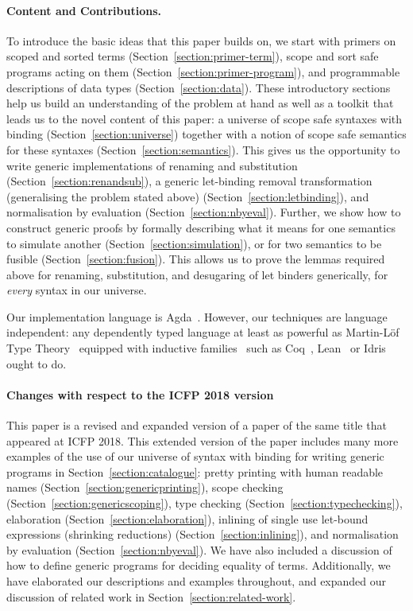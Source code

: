 \paragraph{Content and Contributions.}
To introduce the basic ideas that this paper builds on, we start with
primers on scoped and sorted terms
(Section~\ref{section:primer-term}), scope and sort safe programs
acting on them (Section~\ref{section:primer-program}), and
programmable descriptions of data types (Section~\ref{section:data}).
These introductory sections help us build an understanding of the
problem at hand as well as a toolkit that leads us to the novel
content of this paper: a universe of scope safe syntaxes with binding
(Section~\ref{section:universe}) together with a notion of scope safe
semantics for these syntaxes (Section~\ref{section:semantics}).  This
gives us the opportunity to write generic implementations of renaming
and substitution (Section~\ref{section:renandsub}), a generic
let-binding removal transformation (generalising the problem stated
above) (Section~\ref{section:letbinding}), and normalisation by
evaluation (Section~\ref{section:nbyeval}). Further, we show how to
construct generic proofs by formally describing what it means for one
semantics to simulate another (Section~\ref{section:simulation}), or
for two semantics to be fusible (Section~\ref{section:fusion}). This
allows us to prove the lemmas required above for renaming,
substitution, and desugaring of let binders generically, for
\emph{every} syntax in our universe.

\medskip

Our implementation language is
Agda~\cite{norell2009dependently}. However, our techniques are
language independent: any dependently typed language at least as
powerful as Martin-L\"of Type Theory~\cite{martin1982constructive}
equipped with inductive families~\cite{dybjer1994inductive} such as
Coq~\cite{Coq:manual}, Lean~\cite{DBLP:conf/cade/MouraKADR15} or
Idris~\cite{brady2013idris} ought to do.

\medskip

\paragraph{Changes with respect to the ICFP 2018 version} This paper
is a revised and expanded version of a paper of the same title that
appeared at ICFP 2018. This extended version of the paper includes
many more examples of the use of our universe of syntax with binding
for writing generic programs in Section~\ref{section:catalogue}:
pretty printing with human readable names
(Section~\ref{section:genericprinting}), scope checking
(Section~\ref{section:genericscoping}), type checking
(Section~\ref{section:typechecking}), elaboration
(Section~\ref{section:elaboration}), inlining of single use let-bound
expressions (shrinking reductions) (Section~\ref{section:inlining}),
and normalisation by evaluation (Section~\ref{section:nbyeval}). We
have also included a discussion of how to define generic programs for
deciding equality of terms. Additionally, we have elaborated our
descriptions and examples throughout, and expanded our discussion of
related work in Section~\ref{section:related-work}.

